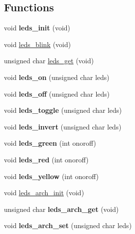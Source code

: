 \subsection*{Functions}
\begin{DoxyCompactItemize}
\item 
\hypertarget{group__leds_ga67cfc3137a465e560792490e81365254}{void {\bfseries leds\-\_\-init} (void)}\label{group__leds_ga67cfc3137a465e560792490e81365254}

\item 
void \hyperlink{group__leds_ga582dbf9799698c90393f6de79d3dca3e}{leds\-\_\-blink} (void)
\item 
unsigned char \hyperlink{group__leds_ga6a175ab2c16737aaf30b263ed8211bbd}{leds\-\_\-get} (void)
\item 
\hypertarget{group__leds_ga8e49b78cf374b9bcdb6ae5704e25fb51}{void {\bfseries leds\-\_\-on} (unsigned char leds)}\label{group__leds_ga8e49b78cf374b9bcdb6ae5704e25fb51}

\item 
\hypertarget{group__leds_gaae6c560bca422fa8d89a57d4c779a246}{void {\bfseries leds\-\_\-off} (unsigned char leds)}\label{group__leds_gaae6c560bca422fa8d89a57d4c779a246}

\item 
\hypertarget{group__leds_gad9ef6d3924cf48998e5e85d480cc355b}{void {\bfseries leds\-\_\-toggle} (unsigned char leds)}\label{group__leds_gad9ef6d3924cf48998e5e85d480cc355b}

\item 
\hypertarget{group__leds_ga0276e87988aa9d2957d9a067247640c6}{void {\bfseries leds\-\_\-invert} (unsigned char leds)}\label{group__leds_ga0276e87988aa9d2957d9a067247640c6}

\item 
\hypertarget{group__leds_gae8f9f52a643587ad2112f3552d135250}{void {\bfseries leds\-\_\-green} (int onoroff)}\label{group__leds_gae8f9f52a643587ad2112f3552d135250}

\item 
\hypertarget{group__leds_gac25a4e5c0aeb959052de5b63b6e1d488}{void {\bfseries leds\-\_\-red} (int onoroff)}\label{group__leds_gac25a4e5c0aeb959052de5b63b6e1d488}

\item 
\hypertarget{group__leds_ga8db5b4dbe9e5a2cc16a3fec950b17d04}{void {\bfseries leds\-\_\-yellow} (int onoroff)}\label{group__leds_ga8db5b4dbe9e5a2cc16a3fec950b17d04}

\item 
void \hyperlink{group__leds_gac287ce66ae3e3751c7c57de50b451ddb}{leds\-\_\-arch\-\_\-init} (void)
\item 
\hypertarget{group__leds_ga5001ce3a53c71d806ab4b4e8eea45d61}{unsigned char {\bfseries leds\-\_\-arch\-\_\-get} (void)}\label{group__leds_ga5001ce3a53c71d806ab4b4e8eea45d61}

\item 
\hypertarget{group__leds_ga01603ac6a925712857e7a50178fe695c}{void {\bfseries leds\-\_\-arch\-\_\-set} (unsigned char leds)}\label{group__leds_ga01603ac6a925712857e7a50178fe695c}

\end{DoxyCompactItemize}


